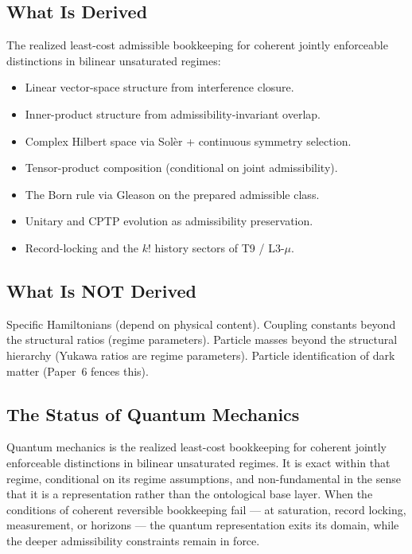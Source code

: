 \documentclass[11pt]{article}
\begin{document}
\subsection{What Is Derived}
The realized least-cost admissible bookkeeping for coherent jointly enforceable
distinctions in bilinear unsaturated regimes:
\begin{itemize}[leftmargin=1.5em,nosep]
    \item Linear vector-space structure from interference closure.
    \item Inner-product structure from admissibility-invariant overlap.
    \item Complex Hilbert space via Sol\`er + continuous symmetry selection.
    \item Tensor-product composition (conditional on joint admissibility).
    \item The Born rule via Gleason on the prepared admissible class.
    \item Unitary and CPTP evolution as admissibility preservation.
    \item Record-locking and the $k!$ history sectors of T9 / L3-$\mu$.
\end{itemize}

\subsection{What Is NOT Derived}
Specific Hamiltonians (depend on physical content). Coupling constants beyond
the structural ratios (regime parameters). Particle masses beyond the structural
hierarchy (Yukawa ratios are regime parameters). Particle identification of dark
matter (Paper~6 fences this).

\subsection{The Status of Quantum Mechanics}
Quantum mechanics is the realized least-cost bookkeeping for coherent jointly
enforceable distinctions in bilinear unsaturated regimes. It is exact within that
regime, conditional on its regime assumptions, and non-fundamental in the sense
that it is a representation rather than the ontological base layer. When the
conditions of coherent reversible bookkeeping fail --- at saturation, record
locking, measurement, or horizons --- the quantum representation exits its
domain, while the deeper admissibility constraints remain in force.

\appendix
\end{document}
